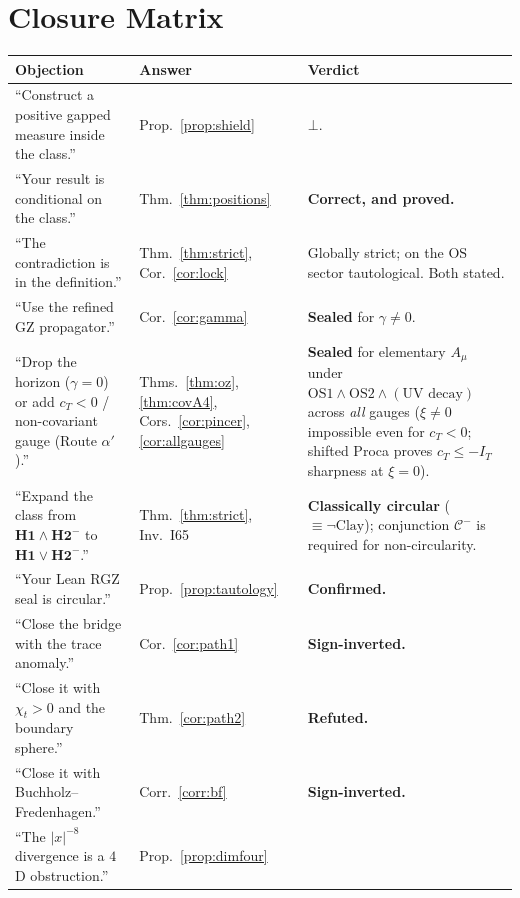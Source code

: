 \documentclass[11pt,a4paper]{article}
\theoremstyle{plain}
\theoremstyle{definition}
\theoremstyle{remark}
\newcommand{\OS}{\mathrm{OS}}\newcommand{\Gap}{\mathrm{Gap}}
\newcommand{\Class}{\mathcal{C}}\newcommand{\Htot}{\mathcal{H}}
\newcommand{\Chit}{\chi_t}
\renewcommand{\_}{\oldunderscore\allowbreak}
\begin{document}
\section{Closure Matrix}
\begin{table}[!htbp]\centering\footnotesize
\renewcommand{\arraystretch}{1.14}
\begin{tabularx}{\textwidth}{p{4.2cm} p{4.3cm} X}
\toprule
\textbf{Objection} & \textbf{Answer} & \textbf{Verdict}\\
\midrule
``Construct a positive gapped measure inside the class.'' & Prop.~\ref{prop:shield} & $\bot$.\\
\midrule
``Your result is conditional on the class.'' & Thm.~\ref{thm:positions} &
\textbf{Correct, and proved.}\\
\midrule
``The contradiction is in the definition.'' & Thm.~\ref{thm:strict}, Cor.~\ref{cor:lock} &
Globally strict; on the $\OS$ sector tautological. Both stated.\\
\midrule
``Use the refined GZ propagator.'' & Cor.~\ref{cor:gamma} & \textbf{Sealed} for $\gamma\neq0$.\\
\midrule
``Drop the horizon ($\gamma=0$) or add $c_T<0$ / non-covariant gauge (Route $\alpha'$).'' & Thms.~\ref{thm:oz}, \ref{thm:covA4}, Cors.~\ref{cor:pincer}, \ref{cor:allgauges} & \textbf{Sealed} for elementary $A_\mu$ under $\OS1\wedge\OS2\wedge(\text{UV decay})$ across \emph{all} gauges ($\xi\neq0$ impossible even for $c_T<0$; shifted Proca proves $c_T\le -I_T$ sharpness at $\xi=0$).\\
\midrule
``Expand the class from $\textbf{H1}\wedge\textbf{H2}^-$ to $\textbf{H1}\vee\textbf{H2}^-$.'' & Thm.~\ref{thm:strict}, Inv.~I65 & \textbf{Classically circular} ($\equiv\neg\mathrm{Clay}$); conjunction $\Class^-$ is required for non-circularity.\\
\midrule
``Your Lean RGZ seal is circular.'' & Prop.~\ref{prop:tautology} & \textbf{Confirmed.}\\
\midrule
``Close the bridge with the trace anomaly.'' & Cor.~\ref{cor:path1} & \textbf{Sign-inverted.}\\
\midrule
``Close it with $\Chit>0$ and the boundary sphere.'' & Thm.~\ref{cor:path2} & \textbf{Refuted.}\\
\midrule
``Close it with Buchholz--Fredenhagen.'' & Corr.~\ref{corr:bf} & \textbf{Sign-inverted.}\\
\midrule
``The $|x|^{-8}$ divergence is a $4$D obstruction.'' & Prop.~\ref{prop:dimfour} &

\end{tabularx}
\end{table}
\end{document}
